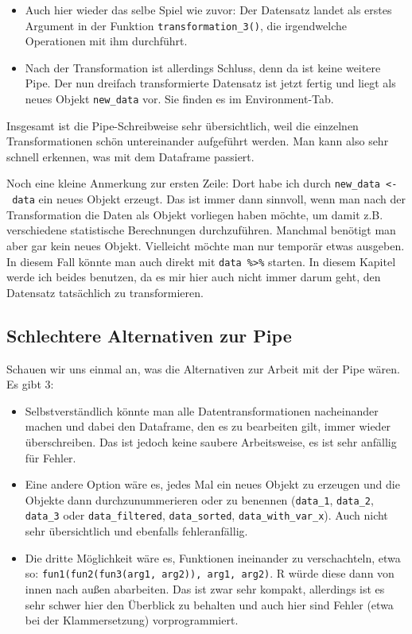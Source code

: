\documentclass[
]{book}
\begin{document}
\begin{enumerate}
  \begin{itemize}
  \item
    Auch hier wieder das selbe Spiel wie zuvor: Der Datensatz landet als erstes Argument in der Funktion \texttt{transformation\_3()}, die irgendwelche Operationen mit ihm durchführt.
  \item
    Nach der Transformation ist allerdings Schluss, denn da ist keine weitere Pipe. Der nun dreifach transformierte Datensatz ist jetzt fertig und liegt als neues Objekt \texttt{new\_data} vor. Sie finden es im Environment-Tab.
  \end{itemize}
\end{enumerate}

Insgesamt ist die Pipe-Schreibweise sehr übersichtlich, weil die einzelnen Transformationen schön untereinander aufgeführt werden. Man kann also sehr schnell erkennen, was mit dem Dataframe passiert.

Noch eine kleine Anmerkung zur ersten Zeile: Dort habe ich durch \texttt{new\_data\ \textless{}-\ data} ein neues Objekt erzeugt. Das ist immer dann sinnvoll, wenn man nach der Transformation die Daten als Objekt vorliegen haben möchte, um damit z.B. verschiedene statistische Berechnungen durchzuführen. Manchmal benötigt man aber gar kein neues Objekt. Vielleicht möchte man nur temporär etwas ausgeben. In diesem Fall könnte man auch direkt mit \texttt{data\ \%\textgreater{}\%} starten. In diesem Kapitel werde ich beides benutzen, da es mir hier auch nicht immer darum geht, den Datensatz tatsächlich zu transformieren.

\hypertarget{schlechtere-alternativen-zur-pipe}{%
\subsection{Schlechtere Alternativen zur Pipe}\label{schlechtere-alternativen-zur-pipe}}

Schauen wir uns einmal an, was die Alternativen zur Arbeit mit der Pipe wären. Es gibt 3:

\begin{itemize}
\item
  Selbstverständlich könnte man alle Datentransformationen nacheinander machen und dabei den Dataframe, den es zu bearbeiten gilt, immer wieder überschreiben. Das ist jedoch keine saubere Arbeitsweise, es ist sehr anfällig für Fehler.
\item
  Eine andere Option wäre es, jedes Mal ein neues Objekt zu erzeugen und die Objekte dann durchzunummerieren oder zu benennen (\texttt{data\_1}, \texttt{data\_2}, \texttt{data\_3} oder \texttt{data\_filtered}, \texttt{data\_sorted}, \texttt{data\_with\_var\_x}). Auch nicht sehr übersichtlich und ebenfalls fehleranfällig.
\item
  Die dritte Möglichkeit wäre es, Funktionen ineinander zu verschachteln, etwa so: \texttt{fun1(fun2(fun3(arg1,\ arg2)),\ arg1,\ arg2)}. R würde diese dann von innen nach außen abarbeiten. Das ist zwar sehr kompakt, allerdings ist es sehr schwer hier den Überblick zu behalten und auch hier sind Fehler (etwa bei der Klammersetzung) vorprogrammiert.
\end{itemize}
\end{document}
